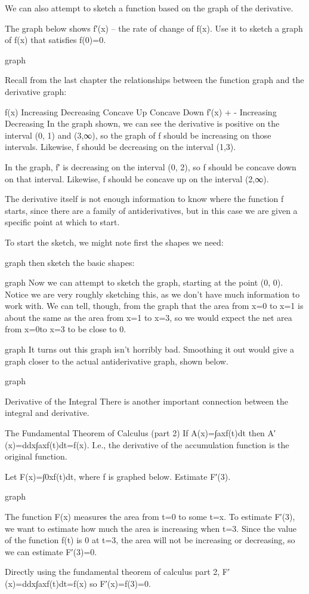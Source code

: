 We can also attempt to sketch a function based on the graph of the derivative.

\begin{example}
The graph below shows f′(x) – the rate of change of f(x). Use it to sketch a graph of f(x) that satisfies f(0)=0.

graph
\begin{solution}
Recall from the last chapter the relationships between the function graph and the derivative graph:

f(x)	Increasing	Decreasing	Concave Up	Concave Down	f′(x)	+	-	Increasing	Decreasing
In the graph shown, we can see the derivative is positive on the interval (0, 1) and (3,∞), so the graph of f should be increasing on those intervals. Likewise, f should be decreasing on the interval (1,3).

In the graph, f′ is decreasing on the interval (0, 2), so f should be concave down on that interval. Likewise, f should be concave up on the interval (2,∞).

The derivative itself is not enough information to know where the function f starts, since there are a family of antiderivatives, but in this case we are given a specific point at which to start.

To start the sketch, we might note first the shapes we need:

graph
then sketch the basic shapes:

graph
Now we can attempt to sketch the graph, starting at the point (0, 0). Notice we are very roughly sketching this, as we don't have much information to work with. We can tell, though, from the graph that the area from x=0 to x=1 is about the same as the area from x=1 to x=3, so we would expect the net area from x=0to x=3 to be close to 0.

graph
It turns out this graph isn't horribly bad. Smoothing it out would give a graph closer to the actual antiderivative graph, shown below.

graph
\end{solution}\end{example}

Derivative of the Integral
There is another important connection between the integral and derivative.

The Fundamental Theorem of Calculus (part 2)
If
A(x)=∫axf(t)dt
then
A′(x)=ddx∫axf(t)dt=f(x).
I.e., the derivative of the accumulation function is the original function.

\begin{example}
Let F(x)=∫0xf(t)dt, where f is graphed below. Estimate F′(3).

graph
\begin{solution}
The function F(x) measures the area from t=0 to some t=x. To estimate F′(3), we want to estimate how much the area is increasing when t=3. Since the value of the function f(t) is 0 at t=3, the area will not be increasing or decreasing, so we can estimate F′(3)=0.

Directly using the fundamental theorem of calculus part 2,
F′(x)=ddx∫axf(t)dt=f(x)
so
F′(x)=f(3)=0.
\end{solution}\end{example}
